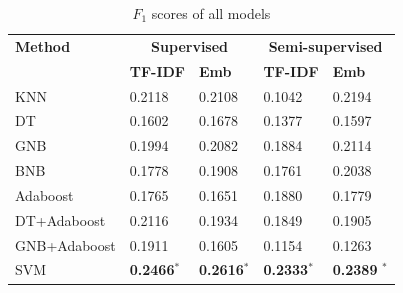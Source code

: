 \documentclass[11pt]{article}
\begin{document}
\begin{table}[h]
    \centering
    \caption{$F_1$ scores of all models}
    \begin{tabularx}{\textwidth}{|l|X|X|X|X|}
    \hline
    \textbf{Method} & \multicolumn{2}{c|}{\textbf{Supervised}} & \multicolumn{2}{c|}{\textbf{Semi-supervised}} \\ \cline{2-5}
                    & \textbf{TF-IDF} & \textbf{Emb} & \textbf{TF-IDF} & \textbf{Emb} \\ \hline
    KNN             & 0.2118          & 0.2108       & 0.1042          & 0.2194       \\
    DT              & 0.1602          & 0.1678       & 0.1377          & 0.1597       \\
    GNB             & 0.1994          & 0.2082       & 0.1884          & 0.2114       \\
    BNB             & 0.1778          & 0.1908       & 0.1761          & 0.2038       \\
    Adaboost        & 0.1765          & 0.1651       & 0.1880          & 0.1779       \\
    DT+Adaboost     & 0.2116          & 0.1934       & 0.1849          & 0.1905       \\
    GNB+Adaboost    & 0.1911          & 0.1605       & 0.1154          & 0.1263       \\
    SVM             & \textbf{0.2466}$^*$  & \textbf{0.2616}$^*$       & \textbf{0.2333}$^*$          & \textbf{0.2389} $^*$        \\ \hline
    \end{tabularx}
    \label{tab:f1_results}
\end{table}
\end{document}
